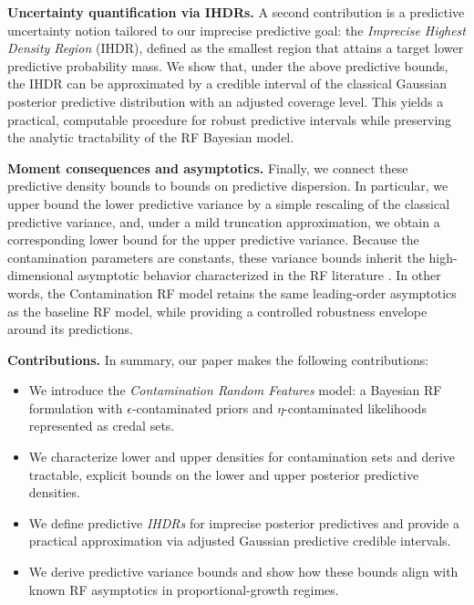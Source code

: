 \documentclass[12pt, english, oneside, a4paper]{article}
\begin{document}
\textbf{Uncertainty quantification via IHDRs.} A second contribution is a predictive uncertainty notion tailored to our imprecise predictive goal: the \emph{Imprecise Highest Density Region} (IHDR), defined as the smallest region that attains a target lower predictive probability mass. We show that, under the above predictive bounds, the IHDR can be approximated by a credible interval of the classical Gaussian posterior predictive distribution with an adjusted coverage level. This yields a practical, computable procedure for robust predictive intervals while preserving the analytic tractability of the RF Bayesian model.

\textbf{Moment consequences and asymptotics.} Finally, we connect these predictive density bounds to bounds on predictive dispersion. In particular, we upper bound the lower predictive variance by a simple rescaling of the classical predictive variance, and, under a mild truncation approximation, we obtain a corresponding lower bound for the upper predictive variance. Because the contamination parameters are constants, these variance bounds inherit the high-dimensional asymptotic behavior characterized in the RF literature \citep{baek2023asymptotics}. In other words, the Contamination RF model retains the same leading-order asymptotics as the baseline RF model, while providing a controlled robustness envelope around its predictions. 

\textbf{Contributions.}
In summary, our paper makes the following contributions:
\begin{itemize}
    \item We introduce the \emph{Contamination Random Features} model: a Bayesian RF formulation with $\epsilon$-contaminated priors and $\eta$-contaminated likelihoods represented as credal sets.
    \item We characterize lower and upper densities for contamination sets and derive tractable, explicit bounds on the lower and upper posterior predictive densities.
    \item We define predictive \emph{IHDRs} for imprecise posterior predictives and provide a practical approximation via adjusted Gaussian predictive credible intervals.
    \item We derive predictive variance bounds and show how these bounds align with known RF asymptotics in proportional-growth regimes.
\end{itemize}
\end{document}
